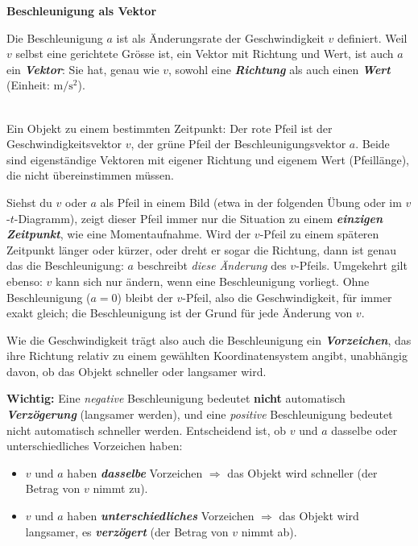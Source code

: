 \documentclass[addpoints,11pt,a4paper]{exam}
\newenvironment{theoriebox}[1][Theorie]{%
  \par\addvspace{10pt}\noindent\textbf{#1}\par\smallskip\noindent
}{%
  \par\addvspace{10pt}
}
\begin{document}
\begin{theoriebox}[Beschleunigung als Vektor]
Die Beschleunigung $a$ ist als Änderungsrate der Geschwindigkeit $v$
definiert. Weil $v$ selbst eine gerichtete Grösse ist, ein Vektor mit
Richtung und Wert, ist auch $a$ ein \textbf{\emph{Vektor}}: Sie hat, genau
wie $v$, sowohl eine \textbf{\emph{Richtung}} als auch einen
\textbf{\emph{Wert}} (Einheit: $\si{\meter\per\second\squared}$).

\begin{center}
\\[0.2em]
{\scriptsize Ein Objekt zu einem bestimmten Zeitpunkt: Der rote Pfeil ist
der Geschwindigkeitsvektor $v$, der grüne Pfeil der
Beschleunigungsvektor $a$. Beide sind eigenständige Vektoren mit
eigener Richtung und eigenem Wert (Pfeillänge), die nicht
übereinstimmen müssen.}
\end{center}

Siehst du $v$ oder $a$ als Pfeil in einem Bild (etwa in der folgenden
Übung oder im $v$-$t$-Diagramm), zeigt dieser Pfeil immer nur die
Situation zu einem \textbf{\emph{einzigen Zeitpunkt}}, wie eine
Momentaufnahme. Wird der $v$-Pfeil zu einem späteren Zeitpunkt länger
oder kürzer, oder dreht er sogar die Richtung, dann ist genau das die
Beschleunigung: $a$ beschreibt \emph{diese Änderung} des $v$-Pfeils.
Umgekehrt gilt ebenso: $v$ kann sich nur ändern, wenn eine Beschleunigung
vorliegt. Ohne Beschleunigung ($a=0$) bleibt der $v$-Pfeil, also die
Geschwindigkeit, für immer exakt gleich; die Beschleunigung ist der
Grund für jede Änderung von $v$.

Wie die Geschwindigkeit trägt also auch die Beschleunigung ein
\textbf{\emph{Vorzeichen}}, das ihre Richtung relativ zu einem gewählten
Koordinatensystem angibt, unabhängig davon, ob das Objekt schneller
oder langsamer wird.

\textbf{Wichtig:} Eine \emph{negative} Beschleunigung bedeutet
\textbf{nicht} automatisch \textbf{\emph{Verzögerung}} (langsamer
werden), und eine \emph{positive} Beschleunigung bedeutet nicht
automatisch schneller werden. Entscheidend ist, ob $v$ und $a$ dasselbe
oder unterschiedliches Vorzeichen haben:
\begin{itemize}[leftmargin=1.2cm,itemsep=0.25em]
  \item $v$ und $a$ haben \textbf{\emph{dasselbe}} Vorzeichen
  $\Rightarrow$ das Objekt wird schneller (der Betrag von $v$ nimmt zu).
  \item $v$ und $a$ haben \textbf{\emph{unterschiedliches}} Vorzeichen
  $\Rightarrow$ das Objekt wird langsamer, es \textbf{\emph{verzögert}}
  (der Betrag von $v$ nimmt ab).
\end{itemize}


\end{theoriebox}
\end{document}
